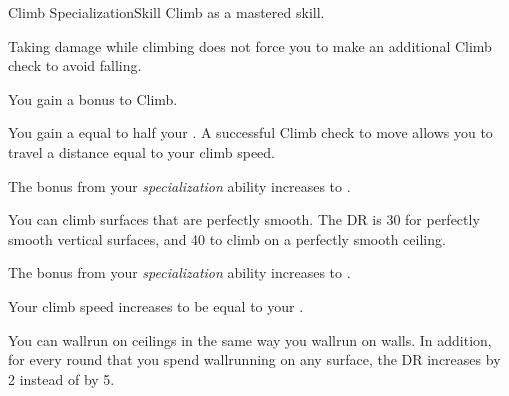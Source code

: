    \begin{feat}{Climb Specialization}{Skill}
        \featpre Climb as a mastered skill.

         Taking damage while climbing does not force you to make an additional Climb check to avoid falling.

         You gain a  bonus to Climb.

         You gain a  equal to half your .
        A successful Climb check to move allows you to travel a distance equal to your climb speed.

         The bonus from your \textit{specialization} ability increases to .

         You can climb surfaces that are perfectly smooth.
        The DR is 30 for perfectly smooth vertical surfaces, and 40 to climb on a perfectly smooth ceiling.

         The bonus from your \textit{specialization} ability increases to .

         Your climb speed increases to be equal to your .

         You can wallrun on ceilings in the same way you wallrun on walls.
        In addition, for every round that you spend wallrunning on any surface, the DR increases by 2 instead of by 5.
    \end{feat}

